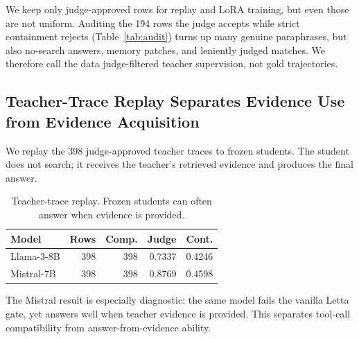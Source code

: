 \documentclass[11pt]{article}
\begin{document}
We keep only judge-approved rows for replay and LoRA training, but even those are not uniform. Auditing the 194 rows the judge accepts while strict containment rejects (Table~\ref{tab:audit}) turns up many genuine paraphrases, but also no-search answers, memory patches, and leniently judged matches. We therefore call the data judge-filtered teacher supervision, not gold trajectories.

\begin{table}[t]
\centering
\small
{}
\caption{Audit of 194 rows where containment fails but GPT-4.1 judge marks the teacher answer correct.}
\label{tab:audit}
\end{table}

\subsection{Teacher-Trace Replay Separates Evidence Use from Evidence Acquisition}

We replay the 398 judge-approved teacher traces to frozen students. The student does not search; it receives the teacher's retrieved evidence and produces the final answer.

\begin{table}[t]
\centering
\small
\begin{tabular}{lrrrr}
\toprule
\textbf{Model} & \textbf{Rows} & \textbf{Comp.} & \textbf{Judge} & \textbf{Cont.} \\
\midrule
Llama-3-8B & 398 & 398 & 0.7337 & 0.4246 \\
Mistral-7B & 398 & 398 & 0.8769 & 0.4598 \\
\bottomrule
\end{tabular}
\caption{Teacher-trace replay. Frozen students can often answer when evidence is provided.}
\label{tab:replay}
\end{table}

The Mistral result is especially diagnostic: the same model fails the vanilla Letta gate, yet answers well when teacher evidence is provided. This separates tool-call compatibility from answer-from-evidence ability.
\end{document}
